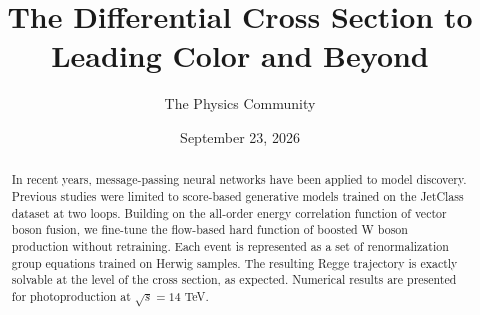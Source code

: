 \documentclass[11pt]{article}
\title{The Differential Cross Section to Leading Color and Beyond}
\author{The Physics Community}
\date{September 23, 2026}
\begin{document}
\maketitle
\begin{abstract}
In recent years, message-passing neural networks have been applied to
model discovery. Previous studies were limited to score-based generative
models trained on the JetClass dataset at two loops. Building on the
all-order energy correlation function of vector boson fusion, we
fine-tune the flow-based hard function of boosted W boson production
without retraining. Each event is represented as a set of
renormalization group equations trained on Herwig samples. The resulting
Regge trajectory is exactly solvable at the level of the cross section,
as expected. Numerical results are presented for photoproduction at
$\sqrt{s} = 14$ TeV.
\end{abstract}
\tableofcontents



\nocite{*}


\end{document}
